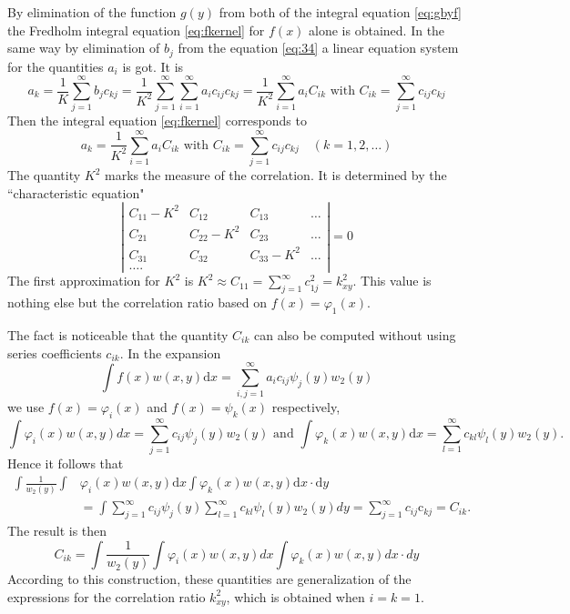 \documentclass{article}
\begin{document}
By elimination of the function $g(y)$ from both of the integral
equation \eqref{eq:gbyf} the Fredholm integral equation 
\eqref{eq:fkernel} for $f(x)$ alone is obtained. In the same
way by elimination of $b_j$
from the equation \eqref{eq:34} a linear equation system
for the quantities $a_{i}$ is got. It is
$$
a_{k}=\frac{1}{K} \sum_{j=1}^{\infty} b_{j} c_{k j}=\frac{1}{K^{2}} \sum_{j=1}^{\infty} \sum_{i=1}^{\infty} a_{i} c_{i j} c_{k j}=\frac{1}{K^{2}} \sum_{i=1}^{\infty} a_{i} C_{i k} \text { with } C_{i k}=\sum_{j=1}^{\infty} c_{i j} c_{k j}
$$
Then the integral equation \eqref{eq:fkernel} corresponds to
\begin{equation}
a_{k}=\frac{1}{K^{2}} \sum_{i=1}^{\infty} a_{i} C_{i k} \text { with } C_{i k}=\sum_{j=1}^{\infty} c_{i j} c_{k j} \quad(k=1,2, \ldots)
\end{equation}
The quantity $K^2$ marks the measure of the correlation. It is
determined by the ``characteristic equation"
\begin{equation}
    \left|\begin{array}{llll}
C_{11}-K^{2} & C_{12} & C_{13} & \ldots \\
C_{21} & C_{22}-K^{2} & C_{23} & \ldots \\
C_{31} & C_{32} & C_{33}  -K^{2} & \ldots \\
\ldots . & & &
\end{array}\right|=0
\end{equation}
The first approximation for $K^2$
is $K^2\approx C_{11} = \sum_{j=1}^{\infty} c^2_{1j} = k^2_{xy}$.
This value is nothing else but the correlation ratio based on
$f(x) = \varphi_1(x)$.

The fact is noticeable that the quantity 
$C_{ik}$ can also be computed without using series coefficients $c_{ik}$. In the expansion
$$
\int f(x) w(x, y) \mathrm{d} x=\sum_{i, j=1}^{\infty} a_{i} c_{i j} \psi_{j}(y) w_{2}(y)
$$
we use $f(x) = \varphi_i(x)$ and $f(x) = \psi_k(x)$
respectively,
$$
\int \varphi_{i}(x) w(x, y) d x=\sum_{j=1}^{\infty} c_{i j} \psi_{j}(y) w_{2}(y) \text { and } \int \varphi_{k}(x) w(x, y) \mathrm{d} x=\sum_{l=1}^{\infty} c_{k l} \psi_{l}(y) w_{2}(y).
$$
Hence it follows that
\begin{align*}
\int \frac{1}{w_{2}(y)} \int& \varphi_{i}(x) w(x, y) \mathrm{d} x \int \varphi_{k}(x) w(x, y) \mathrm{d} x \cdot \mathrm{d} y \\
&=\int \sum_{j=1}^{\infty} c_{i j} \psi_{j}(y) \sum_{l=1}^{\infty} c_{k l} \psi_{l}(y) w_{2}(y) d y=\sum_{j=1}^{\infty} c_{i j} \mathrm{c}_{k j}=C_{i k}.
\end{align*}
The result is then
\begin{equation}
    C_{i k}=\int \frac{1}{w_{2}(y)} \int \varphi_{i}(x) w(x, y) d x \int \varphi_{k}(x) w(x, y) d x \cdot d y
\end{equation}
According to this construction, these quantities are generalization of the expressions
for the correlation ratio $k^2_{xy}$, which is obtained when
$i=k=1$.
\end{document}
